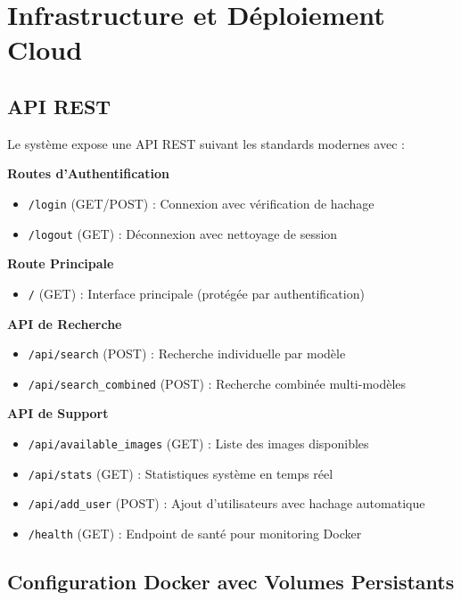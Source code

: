 \documentclass[12pt,a4paper]{article}
\begin{document}
\section{Infrastructure et Déploiement Cloud}

\subsection{API REST}

\begin{implementedbox}
Le système expose une API REST suivant les standards modernes avec :

\textbf{Routes d'Authentification}
\begin{itemize}[leftmargin=2em]
  \item \texttt{/login} (GET/POST) : Connexion avec vérification de hachage
  \item \texttt{/logout} (GET) : Déconnexion avec nettoyage de session
\end{itemize}

\textbf{Route Principale}
\begin{itemize}[leftmargin=2em]
  \item \texttt{/} (GET) : Interface principale (protégée par authentification)
\end{itemize}

\textbf{API de Recherche}
\begin{itemize}[leftmargin=2em]
  \item \texttt{/api/search} (POST) : Recherche individuelle par modèle
  \item \texttt{/api/search\_combined} (POST) : Recherche combinée multi-modèles
\end{itemize}

\textbf{API de Support}
\begin{itemize}[leftmargin=2em]
  \item \texttt{/api/available\_images} (GET) : Liste des images disponibles
  \item \texttt{/api/stats} (GET) : Statistiques système en temps réel
  \item \texttt{/api/add\_user} (POST) : Ajout d'utilisateurs avec hachage automatique
  \item \texttt{/health} (GET) : Endpoint de santé pour monitoring Docker
\end{itemize}
\end{implementedbox}

\subsection{Configuration Docker avec Volumes Persistants}
\end{document}
